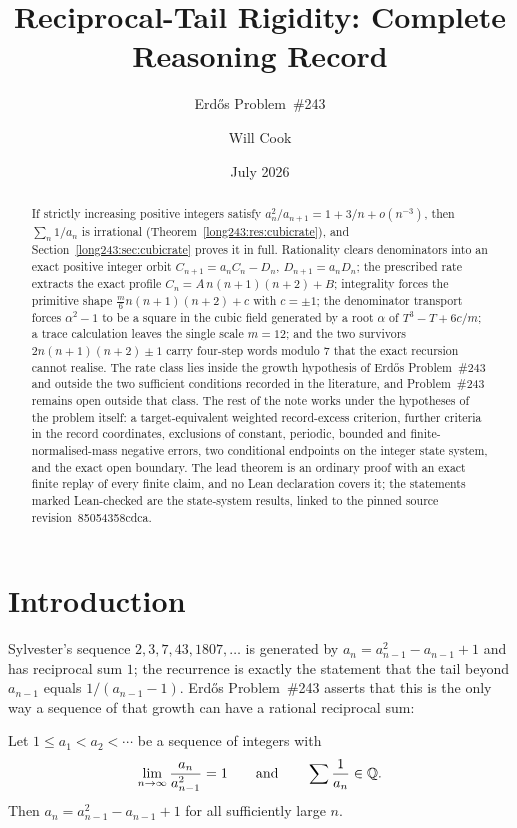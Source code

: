 \documentclass[11pt]{article}
\title{Reciprocal-Tail Rigidity: Complete Reasoning Record}
\subtitle{Erd\H{o}s Problem~\#243}
\author{Will Cook}
\date{July 2026}
\renewcommand{\commitshort}{85054358cdca}
\begin{document}
\maketitle
\noteprovenance

\begin{abstract}
\noindent
If strictly increasing positive integers satisfy
$a_n^2/a_{n+1}=1+3/n+o(n^{-3})$, then $\sum_n1/a_n$ is irrational
(Theorem~\ref{long243:res:cubicrate}), and Section~\ref{long243:sec:cubicrate} proves it in
full.  Rationality clears denominators into an exact positive integer orbit
$C_{n+1}=a_nC_n-D_n$, $D_{n+1}=a_nD_n$; the prescribed rate extracts the exact
profile $C_n=A\,n(n+1)(n+2)+B$; integrality forces the primitive shape
$\frac m6n(n+1)(n+2)+c$ with $c=\pm1$; the denominator transport forces
$\alpha^2-1$ to be a square in the cubic field generated by a root $\alpha$ of
$T^3-T+6c/m$; a trace calculation leaves the single scale $m=12$; and the two
survivors $2n(n+1)(n+2)\pm1$ carry four-step words modulo $7$ that the exact
recursion cannot realise.  The rate class lies inside the growth hypothesis of
Erd\H{o}s Problem~\#243 and outside the two sufficient conditions recorded in
the literature, and Problem~\#243 remains open outside that class.  The rest of
the note works under the hypotheses of the problem itself: a target-equivalent
weighted record-excess criterion, further criteria in the record coordinates,
exclusions of constant, periodic, bounded and finite-normalised-mass negative
errors, two conditional endpoints on the integer state system, and the exact
open boundary.  The lead theorem is an ordinary proof with an exact finite
replay of every finite claim, and no Lean declaration covers it; the
statements marked Lean-checked are the state-system results, linked to the
pinned source revision~\commitshort.
\end{abstract}

\section{Introduction}\label{long243:sec:problem}

Sylvester's sequence $2,3,7,43,1807,\ldots$ is generated by
$a_{n}=a_{n-1}^{2}-a_{n-1}+1$ and has reciprocal sum $1$; the recurrence is
exactly the statement that the tail beyond $a_{n-1}$ equals $1/(a_{n-1}-1)$.
Erd\H{o}s Problem~\#243 asserts that this is the only way a sequence of that
growth can have a rational reciprocal sum:

\begin{problem}[Erd\H{o}s \#243]\label{long243:res:problem}
Let $1\le a_1<a_2<\cdots$ be a sequence of integers with
\[
 \lim_{n\to\infty}\frac{a_n}{a_{n-1}^{2}}=1
 \qquad\text{and}\qquad
 \sum\frac{1}{a_n}\in\mathbb{Q} .
\]
Then $a_n=a_{n-1}^{2}-a_{n-1}+1$ for all sufficiently large $n$.
\end{problem}
\end{document}
